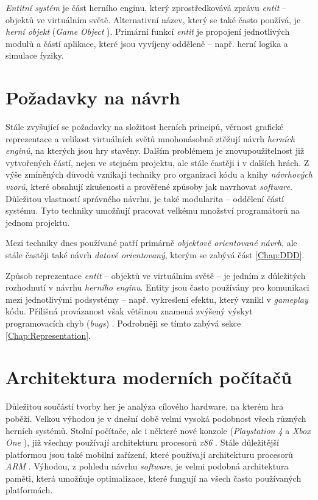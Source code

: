 \emph{Entitní systém} je část herního enginu, který zprostředkovává zprávu \emph{entit} -- objektů ve virtuálním světě. Alternativní název, který se také často používá, je \emph{herní objekt} (\emph{Game Object} \cite{UnityGo}). Primární funkcí \emph{entit} je propojení jednotlivých modulů a částí aplikace, které jsou vyvíjeny odděleně -- např. herní logika a simulace fyziky.

\section{Požadavky na návrh}

Stále zvyšující se požadavky na složitost herních principů, věrnost grafické reprezentace a velikost virtuálních světů mnohonásobně ztěžují návrh \emph{herních enginů}, na kterých jsou hry stavěny. Dalším problémem je znovupoužitelnost již vytvořených částí, nejen ve stejném projektu, ale stále častěji i v dalších hrách. Z výše zmíněných důvodů vznikají techniky pro organizaci kódu a knihy \emph{návrhových vzorů}\cite{DesignPatterns}\cite{GameDesignPatterns}, které obsahují zkušenosti a prověřené způsoby jak navrhovat \emph{software}. Důležitou vlastností správného návrhu, je také modularita -- oddělení částí systému. Tyto techniky umožňují pracovat velkému množství programátorů na jednom projektu.

Mezi techniky dnes používané patří primárně \emph{objektově orientované návrh}, ale stále častěji také návrh \emph{datově orientovaný}, kterým se zabývá část \ref{Chap:DDD}.

Způsob reprezentace \emph{entit} -- objektů ve virtuálním světě -- je jedním z důležitých rozhodnutí v návrhu \emph{herního enginu}. Entity jsou často používány pro komunikaci mezi jednotlivými podsystémy -- např. vykreslení efektu, který vznikl v \emph{gameplay} kódu. Přílišná provázanost však většinou znamená zvýšený výskyt programovacích chyb (\emph{bugs}) \cite{GameDesignPatterns}. Podrobněji se tímto zabývá sekce \ref{Chap:Representation}.

\section{Architektura moderních počítačů}

Důležitou součástí tvorby her je analýza cílového hardware, na kterém hra poběží. Velkou výhodou je v dnešní době velmi vysoká podobnost všech různých herních systémů. Stolní počítače, ale i některé nové konzole (\emph{Playstation 4} a \emph{Xbox One} \cite{Ps4Xbox}), již všechny používají architekturu procesorů \emph{x86} \cite{IntelX86-64} \cite{AmdX86-64}. Stále důležitější platformou jsou také mobilní zařízení, které používají architekturu procesorů \emph{ARM} \cite{ARM}. Výhodou, z pohledu návrhu \emph{software}, je velmi podobná architektura paměti, která umožňuje optimalizace, které fungují na všech často používaných platformách.

